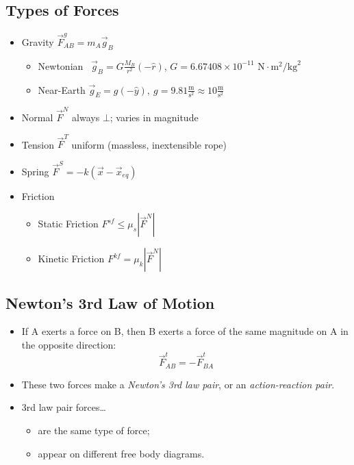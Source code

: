 \documentclass[]{article}
\begin{document}
\begin{PresentSpace}
\vspace{-10pt}
\section*{Types of Forces}
\vspace{-10pt}
\begin{itemize}
	\item Gravity \qquad \qquad \qquad \qquad $\vec{F}^{g}_{AB} = m_{A}\vec{g}_{B}$
	\begin{itemize}
		\item Newtonian \qquad\ $\vec{g}_{B} = G\frac{M_{B}}{r^{2}}(-\hat{r})$, $G = 6.67408\times10^{-11}\text{ N}\cdot\text{m}^{2}/\text{kg}^{2}$
		\item Near-Earth \qquad $\vec{g}_{E} = g(-\hat{y}),\ g=9.81\frac{\text{m}}{\text{s}^{2}} \approx 10\frac{\text{m}}{\text{s}^{2}}$
	\end{itemize}
	\item Normal \qquad $\vec{F}^{N}$ always $\bot$; varies in magnitude
	\item Tension \qquad $\vec{F}^{T}$ uniform (massless, inextensible rope)
	\item Spring \qquad $\vec{F}^{S}=-k(\vec{x}-\vec{x}_{eq})$
	\item Friction
	\begin{itemize}
		\item Static Friction \qquad $F^{sf}\leq\mu_{s}|\vec{F}^{N}|$
		\item Kinetic Friction \qquad $F^{kf}=\mu_{k}|\vec{F}^{N}|$
	\end{itemize}
\end{itemize}
\end{PresentSpace}
\newpage
\begin{TeacherMargin}

\end{TeacherMargin}
\begin{PresentSpace}
\vspace{-10pt}
\section*{Newton's 3rd Law of Motion}
\vspace{-10pt}
\begin{itemize}
	\item If A exerts a force on B, then B exerts a force of the same magnitude on A in the opposite direction:
	\[
	\vec{F}^{t}_{AB} = -\vec{F}^{t}_{BA}
	\]
	\item These two forces make a \textit{Newton's 3rd law pair}, or an \textit{action-reaction pair}.
	\item 3rd law pair forces\dots
	\begin{itemize}
		\item are the same type of force;
		\item appear on different free body diagrams.
	\end{itemize}
\end{itemize}
\end{PresentSpace}
\end{document}
